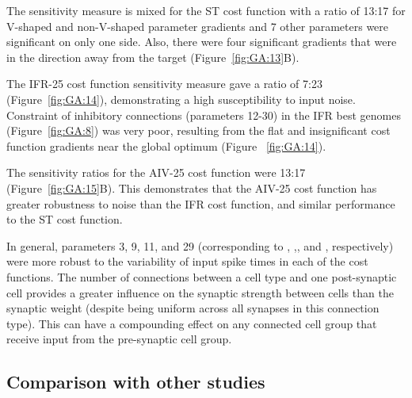 \smallskip{}

The sensitivity measure is mixed for the ST cost function with a ratio of
13:17 for V-shaped and non-V-shaped parameter gradients and 7 other
parameters were significant on only one side. Also, there were four
significant gradients that were in the direction away from the target
(Figure~\ref{fig:GA:13}B).

\smallskip{}

The IFR-25 cost function sensitivity measure gave a ratio of 7:23
(Figure~\ref{fig:GA:14}), demonstrating a high susceptibility to input
noise. Constraint of inhibitory connections (parameters 12-30) in the IFR
best genomes (Figure~\ref{fig:GA:8}) was very poor, resulting from the flat
and insignificant cost function gradients near the global optimum (Figure
~\ref{fig:GA:14}).

\smallskip{}

The sensitivity ratios for the AIV-25 cost function were 13:17
(Figure~\ref{fig:GA:15}B).  This demonstrates that the AIV-25 cost function
has greater robustness to noise than the IFR cost function, and similar
performance to the ST cost function.

\smallskip{}

In general, parameters 3, 9, 11, and 29 (corresponding to \nHSRTS,
\nHSRTV,\nLSRGLG, and \nGLGDS, respectively) were more robust to the
variability of input spike times in each of the cost functions.  The number
of connections between a cell type and one post-synaptic cell provides a
greater influence on the synaptic strength between cells than the synaptic
weight (despite being uniform across all synapses in this connection
type). This can have a compounding effect on any connected cell group that
receive input from the pre-synaptic cell group.


\subsection{Comparison with other studies}\label{sec:GA:comp-with-other}



\smallskip{}


